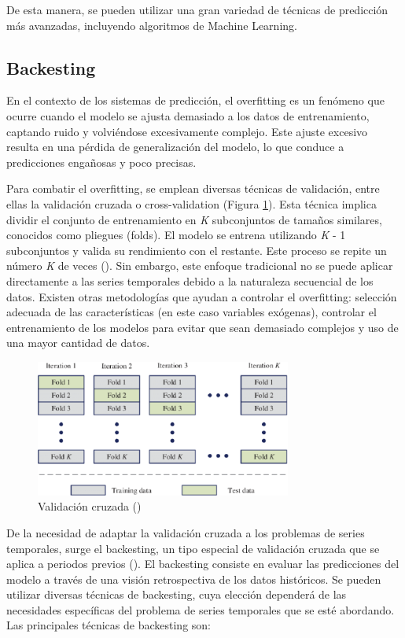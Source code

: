 \documentclass[12pt,a4paper]{report}
\begin{document}
De esta manera, se pueden utilizar una gran variedad de técnicas de predicción más avanzadas, incluyendo algoritmos de Machine Learning.

\subsection{Backesting}

En el contexto de los sistemas de predicción, el overfitting es un fenómeno que ocurre cuando el modelo se ajusta demasiado a los datos de entrenamiento, captando ruido y volviéndose excesivamente complejo. Este ajuste excesivo resulta en una pérdida de generalización del modelo, lo que conduce a predicciones engañosas y poco precisas.


Para combatir el overfitting, se emplean diversas técnicas de validación, entre ellas la validación cruzada o cross-validation (Figura \ref{fig:cross_val}). Esta técnica implica dividir el conjunto de entrenamiento en \textit{K} subconjuntos de tamaños similares, conocidos como pliegues (folds). El modelo se entrena utilizando \textit{K} - 1 subconjuntos y valida su rendimiento con el restante. Este proceso se repite un número \textit{K} de veces (\cite{gonzalezdorado2024ML}). Sin embargo, este enfoque tradicional no se puede aplicar directamente a las series temporales debido a la naturaleza secuencial de los datos. Existen otras metodologías que ayudan a controlar el overfitting: selección adecuada de las características (en este caso variables exógenas), controlar el entrenamiento de los modelos para evitar que sean demasiado complejos y uso de una mayor cantidad de datos.

\begin{figure}[H]
    \centering
    \includegraphics[width=0.75\textwidth]{Images/tfm-2.4.png}
    \caption{Validación cruzada (\cite{researchgate_figura3-4})}
    \label{fig:cross_val}
\end{figure}

De la necesidad de adaptar la validación cruzada a los problemas de series temporales, surge el backesting, un tipo especial de validación cruzada que se aplica a periodos previos (\cite{skforecast}). El backesting consiste en evaluar las predicciones del modelo a través de una visión retrospectiva de los datos históricos. Se pueden utilizar diversas técnicas de backesting, cuya elección dependerá de las necesidades específicas del problema de series temporales que se esté abordando. Las principales técnicas de backesting son:
\end{document}
